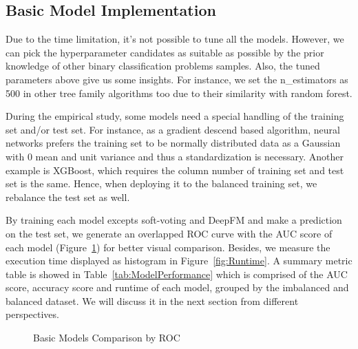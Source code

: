 \documentclass[10pt,twocolumn,letterpaper]{article}
\begin{document}
\subsection{Basic Model Implementation}
Due to the time limitation, it's not possible to tune all the models. However, we can pick the hyperparameter candidates as suitable as possible by the prior knowledge of other binary classification problems samples. Also, the tuned parameters above give us some insights. For instance, we set the n\_estimators as 500 in other tree family algorithms too due to their similarity with random forest.

During the empirical study, some models need a special handling of the training set and/or test set. For instance, as a gradient descend based algorithm, neural networks prefers the training set to be normally distributed data as a Gaussian with 0 mean and unit variance and thus a standardization is necessary. Another example is XGBoost, which requires the column number of training set and test set is the same. Hence, when deploying it to the balanced training set, we rebalance the test set as well.
 
By training each model excepts soft-voting and DeepFM and make a prediction on the test set, we generate an overlapped ROC curve with the AUC score of each model (Figure~\ref{fig:CompareROC}) for better visual comparison. Besides, we measure the execution time displayed as histogram in Figure~\ref{fig:Runtime}. A summary metric table is showed in Table~\ref{tab:ModelPerformance} which is comprised of the AUC score, accuracy score and runtime of each model, grouped by the imbalanced and balanced dataset. We will discuss it in the next section from different perspectives.

\begin{figure}[h]
\begin{center}
    \centering
    \qquad \qquad
\end{center}
    \caption{Basic Models Comparison by ROC}%
\label{fig:CompareROC}
\end{figure}
\end{document}
